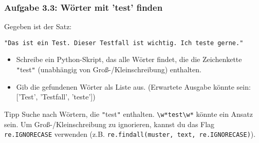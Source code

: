 \documentclass[11pt, a4paper]{article}
\begin{document}
\subsubsection*{Aufgabe 3.3: Wörter mit 'test' finden}
Gegeben ist der Satz:
\begin{verbatim}
"Das ist ein Test. Dieser Testfall ist wichtig. Ich teste gerne."
\end{verbatim}
\begin{itemize}
    \item Schreibe ein Python-Skript, das alle Wörter findet, die die Zeichenkette \texttt{"}test\texttt{"} (unabhängig von Groß-/Kleinschreibung) enthalten.
    \item Gib die gefundenen Wörter als Liste aus. (Erwartete Ausgabe könnte sein: ['Test', 'Testfall', 'teste'])
\end{itemize}
\begin{infoblock}{Tipp}
Suche nach Wörtern, die \texttt{"}test\texttt{"} enthalten. \texttt{\textbackslash{}w*test\textbackslash{}w*} könnte ein Ansatz sein. Um Groß-/Kleinschreibung zu ignorieren, kannst du das Flag \texttt{re.IGNORECASE} verwenden (z.B. \texttt{re.findall(muster, text, re.IGNORECASE)}).
\end{infoblock}
\end{document}
